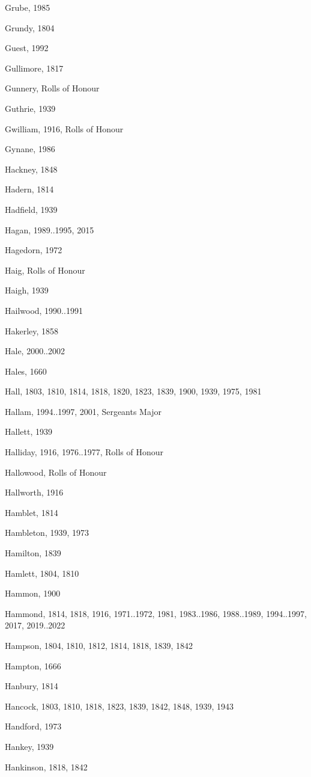 {\begin{theindex}
\item Grube, 1985
\item Grundy, 1804
\item Guest, 1992
\item Gullimore, 1817
\item Gunnery, Rolls of Honour
\item Guthrie, 1939
\item Gwilliam, 1916, Rolls of Honour
\item Gynane, 1986
\item Hackney, 1848
\item Hadern, 1814
\item Hadfield, 1939
\item Hagan, 1989..1995, 2015
\item Hagedorn, 1972
\item Haig, Rolls of Honour
\item Haigh, 1939
\item Hailwood, 1990..1991
\item Hakerley, 1858
\item Hale, 2000..2002
\item Hales, 1660
\item Hall, 1803, 1810, 1814, 1818, 1820, 1823, 1839, 1900, 1939, 1975, 1981
\item Hallam, 1994..1997, 2001, Sergeants Major
\item Hallett, 1939
\item Halliday, 1916, 1976..1977, Rolls of Honour
\item Hallowood, Rolls of Honour
\item Hallworth, 1916
\item Hamblet, 1814
\item Hambleton, 1939, 1973
\item Hamilton, 1839
\item Hamlett, 1804, 1810
\item Hammon, 1900
\item Hammond, 1814, 1818, 1916, 1971..1972, 1981, 1983..1986, 1988..1989, 1994..1997, 2017, 2019..2022
\item Hampson, 1804, 1810, 1812, 1814, 1818, 1839, 1842
\item Hampton, 1666
\item Hanbury, 1814
\item Hancock, 1803, 1810, 1818, 1823, 1839, 1842, 1848, 1939, 1943
\item Handford, 1973
\item Hankey, 1939
\item Hankinson, 1818, 1842

\end{theindex}}
